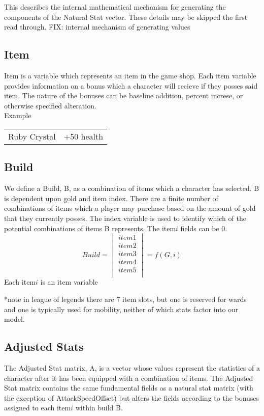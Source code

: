 \documentclass{article}
\begin{document}
This describes the  internal mathematical mechanism for generating the components of the Natural Stat vector.  These details may be skipped the first read through.
FIX: internal mechanism of generating values
\subsection{Item}
Item is a variable which represents an item in the game shop.  Each item variable provides information on a bonus which a character will recieve if they posses said item. The nature of the bonuses can be baseline addition, percent increse, or otherwise specified alteration.\\  Example\\
\begin{tabular}{|c|c|}
Ruby Crystal & +50 health
\end{tabular}
\subsection{Build}
We define a Build, B, as a combination of items which a character has selected.  B is dependent upon gold and item index.  There are a finite number of combinations of items which a player may purchase based on the amount of gold that they currently posses.  The index variable is used to identify which of the potential combinations of items B represents.  The item$i$ fields can be 0.
\begin{equation}
	Build = 
\begin{vmatrix}
	item1\\
	item2\\
	item3\\
	item4\\
	item5\\
\end{vmatrix}=
f(G,i)
\end{equation}
Each item$i$ is an item variable

*note in league of legends there are 7 item slots, but one is reserved for wards and one is typically used for mobility, neither of which stats factor into our model.

\subsection{Adjusted Stats}
The Adjusted Stat matrix, A, is a vector whose values represent the statistics of a character after it has been equipped with a combination of items.  The Adjusted Stat matrix contains the same fundamental fields as a natural stat matrix (with the exception of AttackSpeedOffset)  but alters the fields according to the bonuses assigned to each item$i$ within build B.
\end{document}
